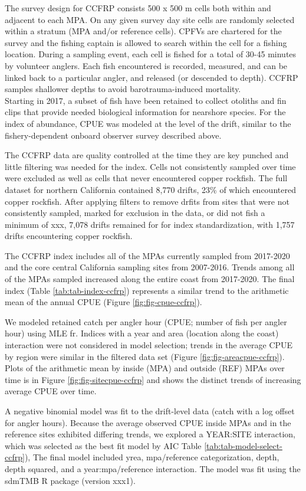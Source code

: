\documentclass[11pt,
  english,
  letterpaper,
]{article}
\begin{document}
The survey design for CCFRP consists 500 x 500 m cells both within and adjacent to each MPA. On any given survey day site cells are randomly selected within a stratum (MPA and/or reference cells). CPFVs are chartered for the survey and the fishing captain is allowed to search within the cell for a fishing location. During a sampling event, each cell is fished for a total of 30-45 minutes by volunteer anglers. Each fish encountered is recorded, measured, and can be linked back to a particular angler, and released (or descended to depth). CCFRP samples shallower depths to avoid barotrauma-induced mortality.\\
Starting in 2017, a subset of fish have been retained to collect otoliths and fin clips that provide needed biological information for nearshore species. For the index of abundance, CPUE was modeled at the level of the drift, similar to the fishery-dependent onboard observer survey described above.

The CCFRP data are quality controlled at the time they are key punched and little filtering was needed for the index. Cells not consistently sampled over time were excluded as well as cells that never encountered copper rockfish. The full dataset for northern California contained 8,770 drifts, 23\% of which encountered copper rockfish. After applying filters to remove drfits from sites that were not consistently sampled, marked for exclusion in the data, or did not fish a minimum of xxx, 7,078 drifts remained for for index standardization, with 1,757 drifts encountering copper rockfish.

The CCFRP index includes all of the MPAs currently sampled from 2017-2020 and the core central California sampling sites from 2007-2016. Trends among all of the MPAs sampled increased along the entire coast from 2017-2020. The final index (Table \ref{tab:tab-index-ccfrp}) represents a similar trend to the arithmetic mean of the annual CPUE (Figure \ref{fig:fig-cpue-ccfrp}).

We modeled retained catch per angler hour (CPUE; number of fish per angler hour) using MLE fr. Indices with a year and area (location along the coast) interaction were not considered in model selection; trends in the average CPUE by region were similar in the filtered data set (Figure \ref{fig:fig-areacpue-ccfrp}). Plots of the arithmetic mean by inside (MPA) and outside (REF) MPAs over time is in Figure \ref{fig:fig-sitecpue-ccfrp} and shows the distinct trends of increasing average CPUE over time.

A negative binomial model was fit to the drift-level data (catch with a log offset for angler hours). Because the average observed CPUE inside MPAs and in the reference sites exhibited differing trends, we explored a YEAR:SITE interaction, which was selected as the best fit model by AIC Table \ref{tab:tab-model-select-ccfrp}), The final model included yrea, mpa/reference categorization, depth, depth squared, and a year:mpa/reference interaction. The model was fit using the sdmTMB R package (version xxx1).
\end{document}
